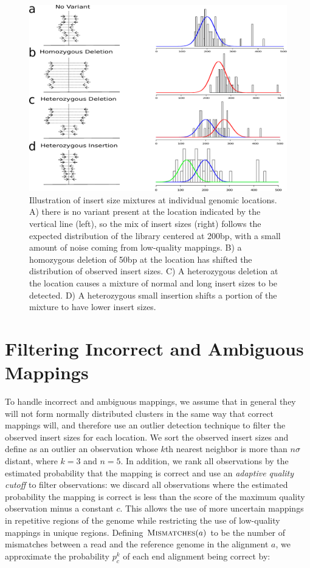 \begin{figure}
\centering
\includegraphics[width=.9\textwidth]{figures/insert_size_mixtures.pdf}
\caption{Illustration of insert size mixtures at individual genomic locations. A) there is no variant present at the location indicated by the vertical line (left), so the mix of insert sizes (right) follows the expected distribution of the library centered at 200bp, with a small amount of noise coming from low-quality mappings. B) a homozygous deletion of 50bp at the location has shifted the distribution of observed insert sizes. C) A heterozygous deletion at the location causes a mixture of normal and long insert sizes to be detected. D) A heterozygous small insertion shifts a portion of the mixture to have lower insert sizes.}
\label{insert_size_mixes}
\end{figure}

\section{Filtering Incorrect and Ambiguous Mappings}\label{section_incorrect_and_ambiguous_mappings}

To handle incorrect and ambiguous mappings, we assume that in general they will not form normally distributed clusters in the same way that correct mappings will, and therefore use an outlier detection technique to filter the observed insert sizes for each location. We sort the observed insert sizes and define as an outlier an observation whose $k$th nearest neighbor is more than $n\sigma$ distant, where $k = 3$ and $n = 5$. In addition, we rank all observations by the estimated probability that the mapping is correct and use an \emph{adaptive quality cutoff} to filter observations: we discard all observations where the estimated probability the mapping is correct is less than the score of the maximum quality observation minus a constant $c$. This allows the use of more uncertain mappings in repetitive regions of the genome while restricting the use of low-quality mappings in unique regions. Defining $\textsc{Mismatches}(a)$ to be the number of mismatches between a read and the reference genome in the alignment $a$, we approximate the probability $p^{k}_c$ of each end alignment being correct by:

